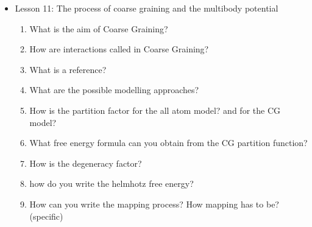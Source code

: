 {\begin{itemize}
\begin{enumerate}
        \item what happens to a liquid with high Temperatures? and with low temperatures? What happens to the partition function?
        \item How is entropy while varying the temperature?
        \item What is phase transition?
        \item What is the order of a phase transition? What happens at the critical point
        \item How is correlation changing outside the CP and in the CP?
        \item When is a system self-similar? what does it mean? To how many parameters depend the correlation length? 
        \item How would you write the hamiltonian of the Ising model by making use of the renormalisation group? And the partition function?
        \item What is the meaning of defocusing? How can defocusing be done?
        \item What is a projection operator?
        \item What happens when you defocus your system in terms of entropy? And what free energy do you obtain?
        \item What happens to the parameters used to describe the hamiltonian at each step if not on a critical point? what if on a critical point? How can you plot the path?
    \end{enumerate}
    \item Lesson 11: The process of coarse graining and the multibody potential
    \begin{enumerate}
        \item What is the aim of Coarse Graining?
        \item How are interactions called in Coarse Graining?
        \item What is a reference?
        \item What are the possible modelling approaches?
        \item How is the partition factor for the all atom model? and for the CG model?
        \item What free energy formula can you obtain from the CG partition function?
        \item How is the degeneracy factor?
        \item how do you write the helmhotz free energy?
        \item How can you write the mapping process? How mapping has to be? (specific)

\end{enumerate}
\end{itemize}}
